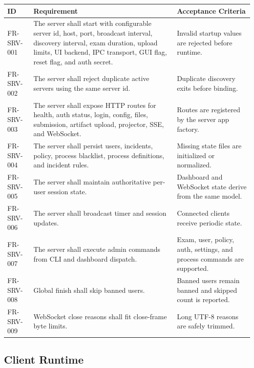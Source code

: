 \documentclass[12pt,a4paper]{article}
\begin{document}
\begin{longtable}{L{0.15\textwidth} L{0.47\textwidth} L{0.28\textwidth}}
\textbf{ID} & \textbf{Requirement} & \textbf{Acceptance Criteria} \\
\hline
FR-SRV-001 & The server shall start with configurable server id, host, port, broadcast interval, discovery interval, exam duration, upload limits, UI backend, IPC transport, GUI flag, reset flag, and auth secret. & Invalid startup values are rejected before runtime. \\
FR-SRV-002 & The server shall reject duplicate active servers using the same server id. & Duplicate discovery exits before binding. \\
FR-SRV-003 & The server shall expose HTTP routes for health, auth status, login, config, files, submission, artifact upload, projector, SSE, and WebSocket. & Routes are registered by the server app factory. \\
FR-SRV-004 & The server shall persist users, incidents, policy, process blacklist, process definitions, and incident rules. & Missing state files are initialized or normalized. \\
FR-SRV-005 & The server shall maintain authoritative per-user session state. & Dashboard and WebSocket state derive from the same model. \\
FR-SRV-006 & The server shall broadcast timer and session updates. & Connected clients receive periodic state. \\
FR-SRV-007 & The server shall execute admin commands from CLI and dashboard dispatch. & Exam, user, policy, auth, settings, and process commands are supported. \\
FR-SRV-008 & Global finish shall skip banned users. & Banned users remain banned and skipped count is reported. \\
FR-SRV-009 & WebSocket close reasons shall fit close-frame byte limits. & Long UTF-8 reasons are safely trimmed. \\
\end{longtable}

\subsection{Client Runtime}
\end{document}
